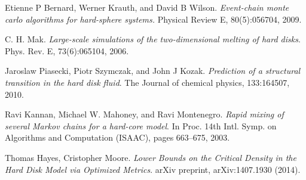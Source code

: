 \documentclass[a4paper,11pt]{article}
\begin{document}
\begin{thebibliography}{9}

  Etienne P Bernard, Werner Krauth, and David B Wilson.
  \emph{Event-chain monte carlo algorithms for hard-sphere systems.}
  Physical Review E,
  80(5):056704, 2009.

  C. H. Mak. 
  \emph{Large-scale simulations of the two-dimensional melting of hard disks}.
  Phys. Rev. E,
  73(6):065104, 2006.

  Jaroslaw Piasecki, Piotr Szymczak, and John J Kozak.
  \emph{Prediction of a structural transition in the hard disk fluid}.
  The Journal of chemical physics,
  133:164507, 2010.

  Ravi Kannan, Michael W. Mahoney, and Ravi Montenegro.
  \emph{Rapid mixing of several Markov chains for a hard-core model}.
  In Proc. 14th Intl. Symp. on Algorithms and Computation (ISAAC),
  pages 663–675, 2003.

  Thomas Hayes, Cristopher Moore.
  \emph{Lower Bounds on the Critical Density in the Hard Disk Model via Optimized Metrics}.
  arXiv preprint,
  arXiv:1407.1930 (2014).

\end{thebibliography}
\end{document}
